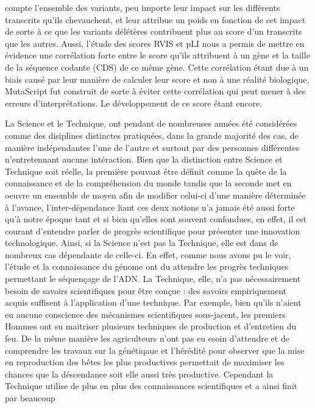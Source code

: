 \documentclass[12pt,twoside]{reedthesis}
\theoremstyle{definition}
\theoremstyle{definition}
\theoremstyle{remark}
\begin{document}
  compte l'ensemble des variants, peu importe leur impact sur les
  différents transcrits qu'ils chevauchent, et leur attribue un poids en
  fonction de cet impact de sorte à ce que les variants délétères
  contribuent plus au score d'un transcrits que les autres. Aussi, l'étude
  des scores RVIS et pLI nous a permis de mettre en évidence une
  corrélation forte entre le score qu'ils attribuent à un gène et la
  taille de la séquence codante (CDS) de ce même gène. Cette corrélation
  étant due à un biais causé par leur manière de calculer leur score et
  non à une réalité biologique, MutaScript fut construit de sorte à éviter
  cette corrélation qui peut mener à des erreurs d'interprétations. Le
  développement de ce score étant encore.
  
  La Science et le Technique, ont pendant de nombreuses années été
  considérées comme des disiplines distinctes pratiquées, dans la grande
  majorité des cas, de manière indépendantes l'une de l'autre et surtout
  par des personnes différentes n'entretennant aucune intéraction. Bien
  que la distinction entre Science et Technique soit réelle, la première
  pouvant être définit comme la quête de la connaissance et de la
  compréhension du monde tandis que la seconde met en oeuvre un ensemble
  de moyen afin de modifier celui-ci d'une manière déterminée à l'avance,
  l'inter-dépendance liant ces deux notions n'a jamais été aussi forte
  qu'à notre époque tant et si bien qu'elles sont souvent confondues, en
  effet, il est courant d'entendre parler de progrès scientifique pour
  présenter une innovation technologique. Ainsi, si la Science n'est pas
  la Technique, elle est dans de nombreux cas dépendante de celle-ci. En
  effet, comme nous avons pu le voir, l'étude et la connaissance du génome
  ont du attendre les progrès techniques permettant le séquençage de
  l'ADN. La Technique, elle, n'a pas nécessairement besoin de savoirs
  scientifiques pour être conçue : des savoirs empiriquement acquis
  suffisent à l'application d'une technique. Par exemple, bien qu'ils
  n'aient eu aucune conscience des mécanismes scientifiques sous-jacent,
  les premiers Hommes ont su maitriser plusieurs techniques de production
  et d'entretien du feu. De la même manière les agriculteurs n'ont pas eu
  esoin d'attendre et de comprendre les travaux sur la génétiqaue et
  l'hérédité pour observer que la mise en reproduction des bêtes les plus
  productives permettait de maximiser les chances que la déscendance soit
  elle aussi très productive. Cependant la Technique utilise de plus en
  plus des connaissances scientifiques et a ainsi finit par beaucoup
\end{document}
